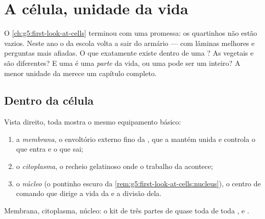 \chapter{A célula, unidade da vida}\label{ch:g6:cell-unit-of-life}

O \cref{ch:g5:first-look-at-cells} terminou com uma promessa: os
quartinhos não estão vazios. Neste ano o  da escola volta a
sair do armário --- com lâminas melhores e perguntas mais afiadas. O
que exatamente existe dentro de uma ? As  vegetais e
 são diferentes? E uma  é uma \emph{parte} da vida, ou
uma  pode ser um  inteiro? A menor unidade da 
merece um capítulo completo.

\section{Dentro da célula}

\begin{definition}\label{def:g6:cell-unit-of-life:parts}
Vista direito, toda  mostra o mesmo equipamento básico:
\begin{enumerate}
  \item a \emph{membrana}, o envoltório externo fino
        da , que a mantém unida e controla o que entra e o que
        sai;
  \item o \emph{citoplasma}, o recheio gelatinoso
        onde o trabalho da  acontece;
  \item o \emph{núcleo} (o pontinho escuro da
        \cref{rem:g5:first-look-at-cells:nucleus}), o centro de
        comando que dirige a vida da  e a divisão dela.
\end{enumerate}
Membrana, citoplasma, núcleo: o kit de três partes de quase toda
 de toda ,  e .
\end{definition}

